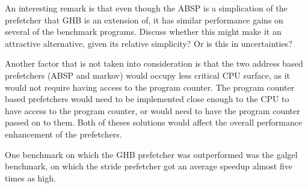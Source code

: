 An interesting remark is that even though the ABSP is a simplication
of the prefetcher that GHB is an extension of, it has similar
performance gains on several of the benchmark programs. Discuss
whether this might make it an attractive alternative, given its
relative simplicity? Or is this in uncertainties?

Another factor that is not taken into consideration is that the two address based prefetchers (ABSP and markov) would occupy less critical CPU surface, as it would not require having access to the program counter. The program counter based prefetchers would need to be implemented close enough to the CPU to have access to the program counter, or would need to have the program counter passed on to them. Both of theses solutions would affect the overall performance enhancement of the prefetchers. 


One benchmark on which the GHB prefetcher was outperformed was the
galgel benchmark, on which the stride prefetcher got an average
speedup almost five times as high.




